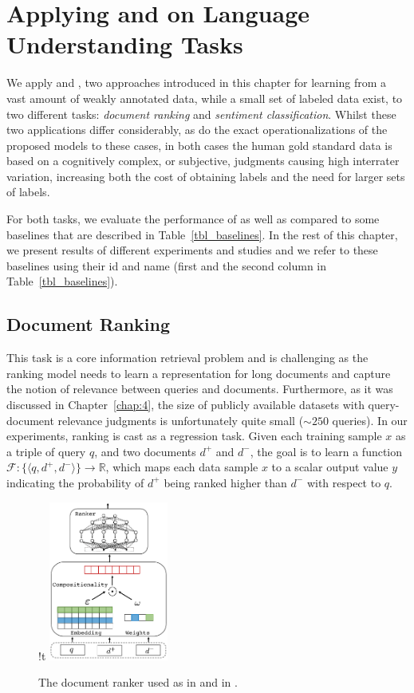 \section{Applying \cws and \fwl on Language Understanding Tasks}
We apply \cws and \fwl, two approaches introduced in this chapter for learning from a vast amount of weakly annotated data, while a small set of labeled data exist, to two different tasks: \emph{document ranking} and \emph{sentiment classification}. 
Whilst these two applications differ considerably, as do the exact operationalizations of the proposed models to these cases, in both cases the human gold standard data is based on a cognitively complex, or subjective, judgments causing high interrater variation, increasing both the cost of obtaining labels and the need for larger sets of labels.


For both tasks, we evaluate the performance of \cws as well as \fwl compared to some baselines that are described in Table~\ref{tbl_baselines}. In the rest of this chapter, we present results of different experiments and studies and we refer to these baselines using their id and name (first and the second column in Table~\ref{tbl_baselines}).

\subsection{Document Ranking}
This task is a core information retrieval problem and is challenging as the ranking model needs to learn a representation for long documents and capture the notion of relevance between queries and documents. Furthermore, as it was discussed in Chapter~\ref{chap:4}, the size of publicly available datasets with query-document relevance judgments is unfortunately quite small (${\sim} 250$ queries).
%
In our experiments, ranking is cast as a regression task. Given each training sample $x$ as a triple of query $q$, and two documents $d^+$ and $d^-$, the goal is to learn a function $\mathcal{F} : \{\langle q, d^+, d^- \rangle\} \rightarrow \mathbb{R}$, which maps each data sample $x$ to a scalar output value $y$ indicating the probability of $d^+$ being ranked higher than $d^-$ with respect to $q$. 

\begin{figure}{!t}
    \centering
            \includegraphics[width=0.35\textwidth]{03-part-02/chapter-05/figs_and_tables/fig_ranker.pdf}
    \caption{The document ranker used as \tch in \cws and \std in \fwl.}
    \label{fig:ranker}
\end{figure}


